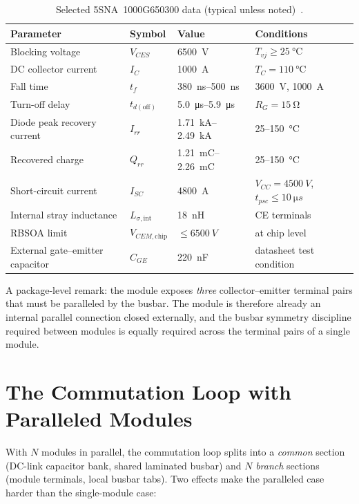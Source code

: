 \documentclass[11pt,a4paper]{article}
\begin{document}
\begin{table}[htb]
\centering
\caption{Selected 5SNA~1000G650300 data (typical unless noted)~\cite{ds}.}
\label{tab:device}
\begin{tabular}{llll}
\toprule
Parameter & Symbol & Value & Conditions \\
\midrule
Blocking voltage & $V_{CES}$ & \SI{6500}{V} & $T_{vj} \geq \SI{25}{\celsius}$ \\
DC collector current & $I_C$ & \SI{1000}{A} & $T_C = \SI{110}{\celsius}$ \\
Fall time & $t_f$ & \SIrange{380}{500}{ns} & \SI{3600}{V}, \SI{1000}{A} \\
Turn-off delay & $t_{d(\mathrm{off})}$ & \SIrange{5.0}{5.9}{\micro s} & $R_G = \SI{15}{\ohm}$ \\
Diode peak recovery current & $I_{rr}$ & \SIrange{1.71}{2.49}{kA} & \SI{25}{}--\SI{150}{\celsius} \\
Recovered charge & $Q_{rr}$ & \SIrange{1.21}{2.26}{mC} & \SI{25}{}--\SI{150}{\celsius} \\
Short-circuit current & $I_{SC}$ & \SI{4800}{A} & $V_{CC} = \SI{4500}{V}$, $t_{psc} \leq \SI{10}{\micro s}$ \\
Internal stray inductance & $L_{\sigma,\mathrm{int}}$ & \SI{18}{nH} & CE terminals \\
RBSOA limit & $V_{CEM,\mathrm{chip}}$ & $\leq \SI{6500}{V}$ & at chip level \\
External gate--emitter capacitor & $C_{GE}$ & \SI{220}{nF} & datasheet test condition \\
\bottomrule
\end{tabular}
\end{table}

A package-level remark: the module exposes \emph{three} collector--emitter terminal
pairs that must be paralleled by the busbar. The module is therefore already an
internal parallel connection closed externally, and the busbar symmetry discipline
required between modules is equally required across the terminal pairs of a single
module.

\section{The Commutation Loop with Paralleled Modules}
With $N$ modules in parallel, the commutation loop splits into a \emph{common} section
(DC-link capacitor bank, shared laminated busbar) and $N$ \emph{branch} sections
(module terminals, local busbar tabs). Two effects make the paralleled case harder
than the single-module case:
\end{document}
